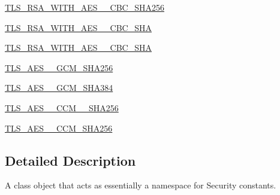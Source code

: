 \begin{DoxyCompactItemize}
\item 
\hyperlink{classpip_1_1__vendor_1_1urllib3_1_1contrib_1_1__securetransport_1_1bindings_1_1SecurityConst_adc823d69446b0119e3aa8b37d67f4c56}{T\+L\+S\+\_\+\+R\+S\+A\+\_\+\+W\+I\+T\+H\+\_\+\+A\+E\+S\+\_\+\_\+\+C\+B\+C\+\_\+\+S\+H\+A256}
\item 
\hyperlink{classpip_1_1__vendor_1_1urllib3_1_1contrib_1_1__securetransport_1_1bindings_1_1SecurityConst_ad3790c9ddcb82481563cd2babb42d602}{T\+L\+S\+\_\+\+R\+S\+A\+\_\+\+W\+I\+T\+H\+\_\+\+A\+E\+S\+\_\+\_\+\+C\+B\+C\+\_\+\+S\+HA}
\item 
\hyperlink{classpip_1_1__vendor_1_1urllib3_1_1contrib_1_1__securetransport_1_1bindings_1_1SecurityConst_a7edd02e9c29bd68a9996d6cc9c628a89}{T\+L\+S\+\_\+\+R\+S\+A\+\_\+\+W\+I\+T\+H\+\_\+\+A\+E\+S\+\_\+\_\+\+C\+B\+C\+\_\+\+S\+HA}
\item 
\hyperlink{classpip_1_1__vendor_1_1urllib3_1_1contrib_1_1__securetransport_1_1bindings_1_1SecurityConst_a5a3c3dcc5a4b9e7a00fde1a6ac529ee2}{T\+L\+S\+\_\+\+A\+E\+S\+\_\+\_\+\+G\+C\+M\+\_\+\+S\+H\+A256}
\item 
\hyperlink{classpip_1_1__vendor_1_1urllib3_1_1contrib_1_1__securetransport_1_1bindings_1_1SecurityConst_a0983f9c8702d3a994b532af12fabbb58}{T\+L\+S\+\_\+\+A\+E\+S\+\_\+\_\+\+G\+C\+M\+\_\+\+S\+H\+A384}
\item 
\hyperlink{classpip_1_1__vendor_1_1urllib3_1_1contrib_1_1__securetransport_1_1bindings_1_1SecurityConst_a239124f06ec0ecd5324a1799e71aeddb}{T\+L\+S\+\_\+\+A\+E\+S\+\_\+\_\+\+C\+C\+M\+\_\+\_\+\+S\+H\+A256}
\item 
\hyperlink{classpip_1_1__vendor_1_1urllib3_1_1contrib_1_1__securetransport_1_1bindings_1_1SecurityConst_a4def29a2923745922b0491f1b88a2515}{T\+L\+S\+\_\+\+A\+E\+S\+\_\+\_\+\+C\+C\+M\+\_\+\+S\+H\+A256}
\end{DoxyCompactItemize}


\subsection{Detailed Description}
\begin{DoxyVerb}A class object that acts as essentially a namespace for Security constants.
\end{DoxyVerb}
 

